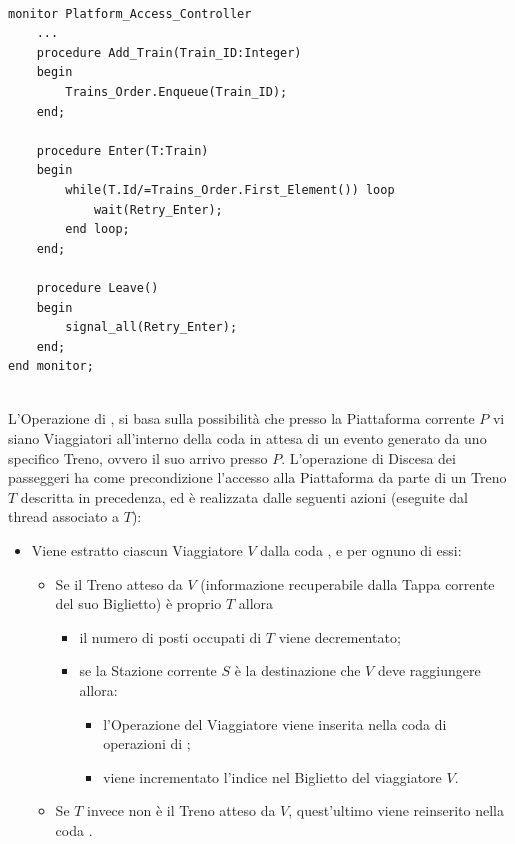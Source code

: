 \begin{description}
\begin{lstlisting}[label=platform_access_controller]

monitor Platform_Access_Controller 
	...
	procedure Add_Train(Train_ID:Integer) 
	begin
		Trains_Order.Enqueue(Train_ID);
	end;
	
	procedure Enter(T:Train) 
	begin
		while(T.Id/=Trains_Order.First_Element()) loop
			wait(Retry_Enter);
		end loop;
	end;
	
	procedure Leave()
	begin
		signal_all(Retry_Enter);
	end;
end monitor;
	
\end{lstlisting}
		
		L'Operazione di , si basa sulla possibilità che presso la Piattaforma corrente $P$ vi siano Viaggiatori all'interno della coda  in attesa di un evento generato da uno specifico Treno, ovvero il suo arrivo presso $P$. L'operazione di Discesa dei passeggeri ha come precondizione l'accesso alla Piattaforma da parte di un Treno $T$ descritta in precedenza, ed è realizzata dalle seguenti azioni (eseguite dal thread associato a $T$):
		\begin{itemize}
			\item Viene estratto ciascun Viaggiatore $V$ dalla coda , e per ognuno di essi:
			\begin{itemize}
				\item Se il Treno atteso da $V$ (informazione recuperabile dalla Tappa corrente del suo Biglietto) è proprio $T$ allora
					\begin{itemize}
						\item il numero di posti occupati di $T$ viene decrementato;
						\item se la Stazione corrente $S$  è la destinazione che $V$ deve raggiungere allora:
							\begin{itemize}
								\item l'Operazione  del Viaggiatore viene inserita nella coda di operazioni di ;
								\item viene incrementato l'indice  nel Biglietto del viaggiatore $V$.
							\end{itemize}
					\end{itemize}
				\item Se $T$ invece non è il Treno atteso da $V$, quest'ultimo viene reinserito nella coda .
			\end {itemize}
		\end{itemize}
		

\end{description}
